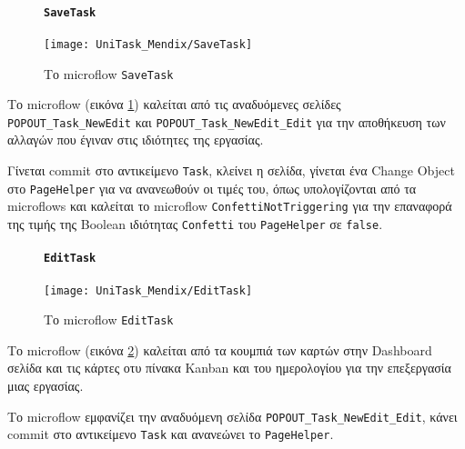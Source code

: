                 \begin{figure}[H] \noindent
                    \paragraph{\texttt{SaveTask}}
                    \begin{center}
                        \texttt{[image: UniTask\_Mendix/SaveTask]}
                        \caption{\centering Το microflow \texttt{SaveTask}}
                        \label{fig:unitask_SaveTask}
                    \end{center}
                \end{figure}

                Το microflow (εικόνα \ref{fig:unitask_SaveTask}) καλείται από τις αναδυόμενες σελίδες \texttt{POPOUT\_Task\_NewEdit} και \texttt{POPOUT\_Task\_NewEdit\_Edit} για την αποθήκευση των αλλαγών που έγιναν στις ιδιότητες της εργασίας.

                Γίνεται commit στο αντικείμενο \texttt{Task}, κλείνει η σελίδα, γίνεται ένα Change Object στο \texttt{PageHelper} για να ανανεωθούν οι τιμές του, όπως υπολογίζονται από τα microflows και καλείται το microflow \texttt{ConfettiNotTriggering} για την επαναφορά της τιμής της Boolean ιδιότητας \texttt{Confetti} του \texttt{PageHelper} σε \texttt{false}.

                \begin{figure}[H] \noindent
                    \paragraph{\texttt{EditTask}}
                    \begin{center}
                        \texttt{[image: UniTask\_Mendix/EditTask]}
                        \caption{\centering Το microflow \texttt{EditTask}}
                        \label{fig:unitask_EditTask_microflow}
                    \end{center}
                \end{figure}

                Το microflow (εικόνα \ref{fig:unitask_EditTask_microflow}) καλείται από τα κουμπιά των καρτών στην Dashboard σελίδα και τις κάρτες οτυ πίνακα Kanban και του ημερολογίου για την επεξεργασία μιας εργασίας.

                Το microflow εμφανίζει την αναδυόμενη σελίδα \texttt{POPOUT\_Task\_NewEdit\_Edit}, κάνει commit στο αντικείμενο \texttt{Task} και ανανεώνει το \texttt{PageHelper}.

